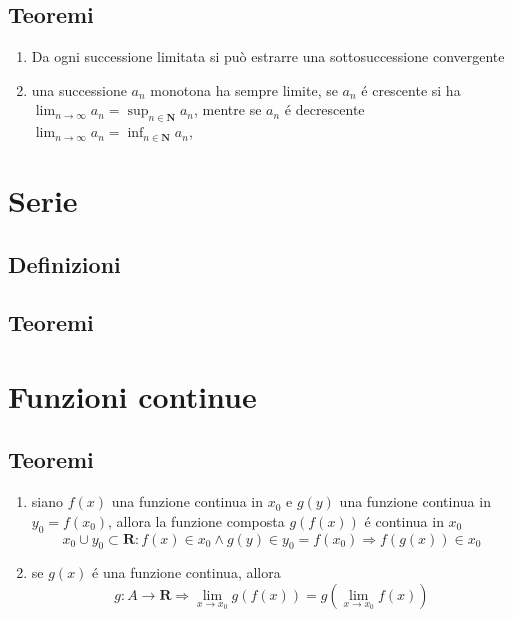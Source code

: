 \documentclass{exam}
\begin{document}
  
  
  \subsection{Teoremi}
    \begin{enumerate}
      \item Da ogni successione limitata si può estrarre una sottosuccessione convergente
      \item una successione $a_{n}$ monotona ha sempre limite, se $a_{n}$ \'e crescente si ha 
      \(\displaystyle \lim_{n\to \infty}a_{n}= \sup_{n\in \mathbf{N}}a_{n}\),
      mentre se $a_{n}$ \'e decrescente
      \(\displaystyle \lim_{n\to \infty}a_{n}= \inf_{n\in \mathbf{N}}a_{n}\),
    \end{enumerate}
  \newpage





\section{Serie}
 \subsection{Definizioni}
 
 
 
 \subsection{Teoremi}
  \newpage





\section{Funzioni continue}
  \subsection{Teoremi}
    \begin{enumerate}
      \item
        siano $f(x)$ una funzione continua in $x_{0}$ e
        $g(y)$ una funzione continua in $y_{0}=f(x_{0})$, allora
        la funzione composta $g(f(x))$ \'e continua in $x_{0}$
        \begin{displaymath}
          x_{0}\cup y_{0}\subset \mathbf{R}:f(x) \in x_{0} \land g(y) 
          \in y_{0}=f(x_{0}) \Rightarrow f(g(x))\in x_{0}
        \end{displaymath}
      \item
        se $g(x)$ \'e una funzione continua, allora
        \begin{displaymath}
          g:A\rightarrow \mathbf{R}\Rightarrow\lim_{x\to x_{0}}g(f(x))=g(\lim_{x\to x_{0}}f(x))
        \end{displaymath}
    \end{enumerate}
\end{document}
